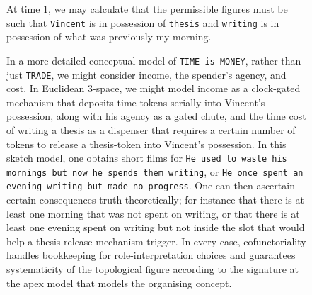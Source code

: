 \begin{example}
\begin{figure}[h]
\end{figure}
\begin{figure}[h]\label{fig:time1}
\centering
{}
\caption{At time 1, we may calculate that the permissible figures must be such that \texttt{Vincent} is in possession of \texttt{thesis} and \texttt{writing} is in possession of what was previously my morning.}
\end{figure}
\begin{figure}[h]\label{fig:fullermodel}
\centering
{}
\caption{In a more detailed conceptual model of \texttt{TIME is MONEY}, rather than just \texttt{TRADE}, we might consider income, the spender's agency, and cost. In Euclidean 3-space, we might model income as a clock-gated mechanism that deposits time-tokens serially into Vincent's possession, along with his agency as a gated chute, and the time cost of writing a thesis as a dispenser that requires a certain number of tokens to release a thesis-token into Vincent's possession. In this sketch model, one obtains short films for \texttt{He used to waste his mornings but now he spends them writing}, or \texttt{He once spent an evening writing but made no progress}. One can then ascertain certain consequences truth-theoretically; for instance that there is at least one morning that was not spent on writing, or that there is at least one evening spent on writing but not inside the slot that would help a thesis-release mechanism trigger. In every case, cofunctoriality handles bookkeeping for role-interpretation choices and guarantees systematicity of the topological figure according to the signature at the apex model that models the organising concept.}
\end{figure}
\end{example}

